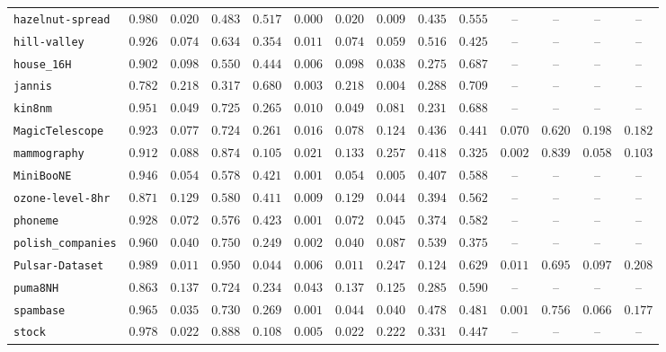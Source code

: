 {\begin{tabular}{@{}lccccccccccccc@{}}
\texttt{hazelnut-spread} & $0.980$ & $0.020$ & $0.483$ & $0.517$ & $0.000$ & $0.020$ & $0.009$ & $0.435$ & $0.555$ & -- & -- & -- & -- \\
\texttt{hill-valley} & $0.926$ & $0.074$ & $0.634$ & $0.354$ & $0.011$ & $0.074$ & $0.059$ & $0.516$ & $0.425$ & -- & -- & -- & -- \\
\texttt{house\_16H} & $0.902$ & $0.098$ & $0.550$ & $0.444$ & $0.006$ & $0.098$ & $0.038$ & $0.275$ & $0.687$ & -- & -- & -- & -- \\
\texttt{jannis} & $0.782$ & $0.218$ & $0.317$ & $0.680$ & $0.003$ & $0.218$ & $0.004$ & $0.288$ & $0.709$ & -- & -- & -- & -- \\
\texttt{kin8nm} & $0.951$ & $0.049$ & $0.725$ & $0.265$ & $0.010$ & $0.049$ & $0.081$ & $0.231$ & $0.688$ & -- & -- & -- & -- \\
\texttt{MagicTelescope} & $0.923$ & $0.077$ & $0.724$ & $0.261$ & $0.016$ & $0.078$ & $0.124$ & $0.436$ & $0.441$ & $0.070$ & $0.620$ & $0.198$ & $0.182$ \\
\texttt{mammography} & $0.912$ & $0.088$ & $0.874$ & $0.105$ & $0.021$ & $0.133$ & $0.257$ & $0.418$ & $0.325$ & $0.002$ & $0.839$ & $0.058$ & $0.103$ \\
\texttt{MiniBooNE} & $0.946$ & $0.054$ & $0.578$ & $0.421$ & $0.001$ & $0.054$ & $0.005$ & $0.407$ & $0.588$ & -- & -- & -- & -- \\
\texttt{ozone-level-8hr} & $0.871$ & $0.129$ & $0.580$ & $0.411$ & $0.009$ & $0.129$ & $0.044$ & $0.394$ & $0.562$ & -- & -- & -- & -- \\
\texttt{phoneme} & $0.928$ & $0.072$ & $0.576$ & $0.423$ & $0.001$ & $0.072$ & $0.045$ & $0.374$ & $0.582$ & -- & -- & -- & -- \\
\texttt{polish\_companies} & $0.960$ & $0.040$ & $0.750$ & $0.249$ & $0.002$ & $0.040$ & $0.087$ & $0.539$ & $0.375$ & -- & -- & -- & -- \\
\texttt{Pulsar-Dataset} & $0.989$ & $0.011$ & $0.950$ & $0.044$ & $0.006$ & $0.011$ & $0.247$ & $0.124$ & $0.629$ & $0.011$ & $0.695$ & $0.097$ & $0.208$ \\
\texttt{puma8NH} & $0.863$ & $0.137$ & $0.724$ & $0.234$ & $0.043$ & $0.137$ & $0.125$ & $0.285$ & $0.590$ & -- & -- & -- & -- \\
\texttt{spambase} & $0.965$ & $0.035$ & $0.730$ & $0.269$ & $0.001$ & $0.044$ & $0.040$ & $0.478$ & $0.481$ & $0.001$ & $0.756$ & $0.066$ & $0.177$ \\
\texttt{stock} & $0.978$ & $0.022$ & $0.888$ & $0.108$ & $0.005$ & $0.022$ & $0.222$ & $0.331$ & $0.447$ & -- & -- & -- & -- \\

\end{tabular}}

